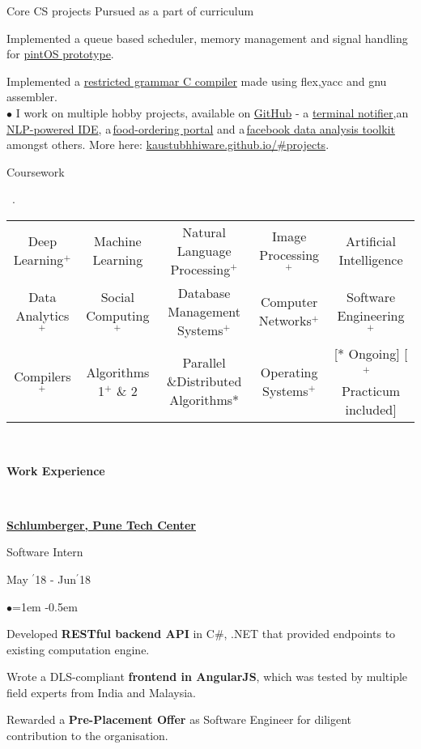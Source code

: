 \documentclass[11pt, a4paper]{resume}
\newcommand{\important}[1]{
	\textcolor{mypurple}{#1}
}
\newcommand{\fillit}[1]{
	\leavevmode\xleaders\hbox{#1}\hfill\kern0pt
}
\newcommand{\sectionTitle}[1]{
	\begin{Large}
    	\important{\textbf{#1}} 
    \end{Large}
    \important{\rlap{\rule[.5ex]{\linegoal}{0.5pt}}{}}
     \vspace{0.1em}\\
}
\newcommand{\sectionSubtitleX}[1]{
	\begin{large}
    \important{#1}
    \end{large}
    \fillit{\important{.}}
}
\newcommand{\textbox}[1]{
  \parbox{.333\textwidth}{#1}
}
\newenvironment{Jobsection}[3]{ %
\noindent\textbox{\bf #1\hfill}\textbox{\hfil #2\hfil}\textbox{\hfill #3}
  \begin{list}{$\bullet$}{\leftmargin=1em} %
   \itemsep -0.5em \vspace{-0.5em} %
  }{
  \end{list}
  \vspace{0.2em} %
}
\begin{document}
\begin{rSubsection}{Core CS projects}{\hspace*{\fill} Pursued as a part of curriculum}{}{}
\item Implemented a queue based scheduler, memory management and signal handling for \href{https://github.com/kaustubhhiware/OSLab}{pintOS prototype}.
\item Implemented a \href{https://github.com/kaustubhhiware/cOMPILER}{restricted grammar C compiler} made using flex,yacc and gnu assembler.\\
$\bullet$ I work on multiple hobby projects, available on \href{https://github.com/kaustubhhiware}{GitHub} - a \href{https://github.com/kaustubhhiware/ NotiFyre}{terminal notifier},an\,\href{https://github.com/kaustubhhiware/c0derunR}{ NLP-powered IDE}, a\,\href{https://github.com/kaustubhhiware/Foodspark}{food-ordering portal} and a\,\href{https://github.com/kaustubhhiware/facebook-archive}{facebook data analysis toolkit} amongst others. More here: \href{https://kaustubhhiware.github.io/#projects}{kaustubhhiware.github.io/\#projects}.
\end{rSubsection}

\sectionSubtitleX{Coursework} 
\begin{tabular}{>{\footnotesize}c>{\footnotesize}c>{\footnotesize}c>{\footnotesize}c>{\footnotesize}c}
Deep Learning$^+$ & Machine Learning & Natural Language Processing$^+$ & Image Processing\*$^+$ & Artificial Intelligence \\
Data Analytics$^+$ & Social Computing$^+$ & Database Management Systems$^+$ & Computer Networks$^+$ & Software Engineering$^+$ \\
Compilers$^+$ & Algorithms 1$^+$ \& 2 & Parallel \&Distributed Algorithms* & Operating Systems$^+$ & {\scriptsize [* Ongoing]\,\,[$^+$ \,\,Practicum included]} \\
\end{tabular}\\

\sectionTitle{Work Experience}
\begin{Jobsection}{\href{https://drive.google.com/file/d/1EcfIC_g8bx3whaxMdOkFyZx4TCqA1RAq/view?usp=sharing}{Schlumberger, Pune Tech Center}}{Software Intern}{ May $^{\prime}$18 - Jun$^{\prime}$18}
\item Developed {\bf RESTful backend API} in C\#, .NET that provided endpoints to existing computation engine.
\item Wrote a DLS-compliant {\bf frontend in AngularJS}, which was tested  by multiple field experts from India and Malaysia.
\item Rewarded a {\bf Pre-Placement Offer} as Software Engineer for diligent contribution to the organisation.
\end{Jobsection}
\end{document}
